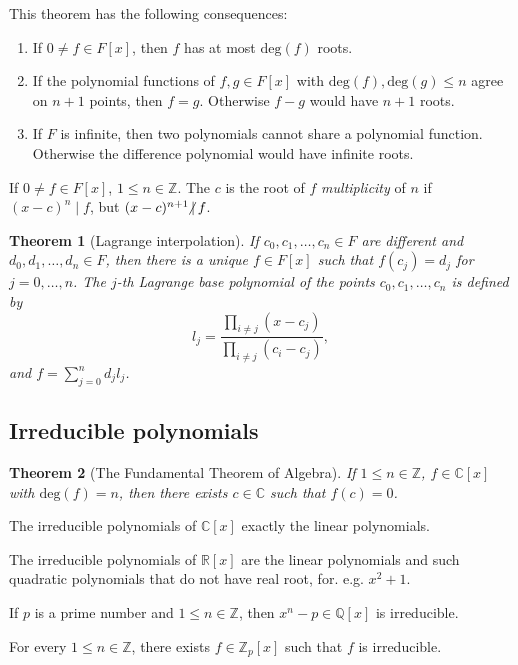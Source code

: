 \documentclass{article}
\newcommand{\Z}{\mathbb{Z}}
\newcommand{\nmid}{\hspace{-4pt}\not|\hspace{2pt}}
\newtheorem{theorem}{Theorem}
\begin{document}
This theorem has the following consequences:
\begin{enumerate}
    \item If $0 \neq f \in F[x]$, then $f$ has at most $\mathrm{deg}(f)$ roots.
    \item If the polynomial functions of $f,g \in F[x]$ with $\mathrm{deg}(f), \mathrm{deg}(g) \le n$ agree on $n+1$ points, then $f=g$. Otherwise $f-g$ would have $n+1$ roots.
    \item If $F$ is infinite, then two polynomials cannot share a polynomial function. Otherwise the difference polynomial would have infinite roots.
\end{enumerate}

If $0 \neq f \in F[x]$, $1 \le n \in \Z$. The $c$ is the root of $f$ \emph{multiplicity} of $n$ if $(x-c)^n \mid f$, but $(x-c)^{n+1} \nmid f$.

\begin{theorem}[Lagrange interpolation]
    If $c_0,c_1,\ldots,c_n \in F$ are different and $d_0,d_1,\ldots,d_n \in F$, then there is a unique $f\in F[x]$ such that $f(c_j) = d_j$ for $j=0,\ldots,n$.
    The $j$-th Lagrange base polynomial of the points $c_0,c_1,\ldots,c_n$ is defined by
    \[
        l_j = \frac{\prod_{i \neq j} (x - c_j)}{\prod_{i \neq j} (c_i - c_j)},
    \]
    and $f = \sum_{j=0}^n d_j l_j$.
\end{theorem}

\subsection{Irreducible polynomials}

\begin{theorem}[The Fundamental Theorem of Algebra]
    If $1 \le n \in \Z$, $f \in \mathbb{C}[x]$ with $\mathrm{deg}(f) = n$, then there exists $c\in\mathbb{C}$ such that $f(c) = 0$.
\end{theorem}

The irreducible polynomials of $\mathbb{C}[x]$ exactly the linear polynomials.

The irreducible polynomials of $\mathbb{R}[x]$ are the linear polynomials and such quadratic polynomials that do not have real root, for. e.g. $x^2 + 1$.

If $p$ is a prime number and $1 \le n \in \Z$, then $x^n - p \in \mathbb{Q}[x]$ is irreducible.

For every $1 \le n \in \Z$, there exists $f \in \Z_p[x]$ such that $f$ is irreducible.
\end{document}
